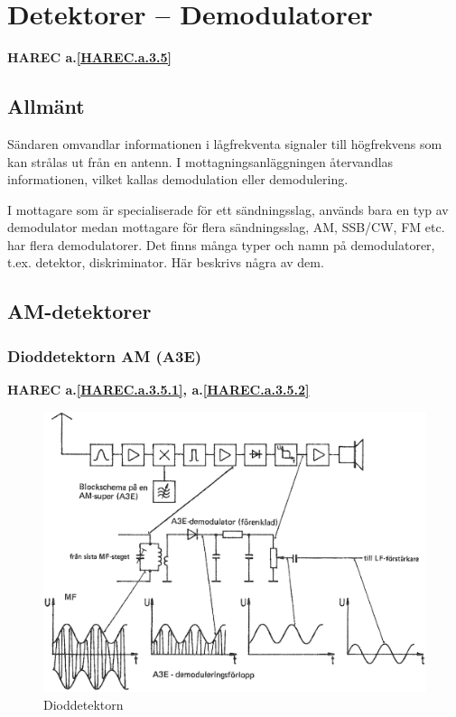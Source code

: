 \section{Detektorer -- Demodulatorer}
\textbf{HAREC a.\ref{HAREC.a.3.5}\label{myHAREC.a.3.5}}
\label{detektorer}

\subsection{Allmänt}

Sändaren omvandlar informationen i lågfrekventa signaler till
högfrekvens som kan strålas ut från en antenn. I
mottagningsanläggningen återvandlas informationen, vilket kallas
demodulation eller demodulering.

I mottagare som är specialiserade för ett sändningsslag, används bara
en typ av demodulator medan mottagare för flera sändningsslag, AM,
SSB/CW, FM etc. har flera demodulatorer. Det finns många typer och
namn på demodulatorer, t.ex. detektor, diskriminator. Här beskrivs
några av dem.

\subsection{AM-detektorer}

\subsubsection{Dioddetektorn AM (A3E)}
\textbf{HAREC
  a.\ref{HAREC.a.3.5.1}\label{myHAREC.a.3.5.1},
  a.\ref{HAREC.a.3.5.2}\label{myHAREC.a.3.5.2}
}

\begin{figure}
\includegraphics[width=\textwidth]{images/cropped_pdfs/bild_2_3-55.pdf}
\caption{Dioddetektorn}
\label{fig:BildII3-55}
\end{figure}

